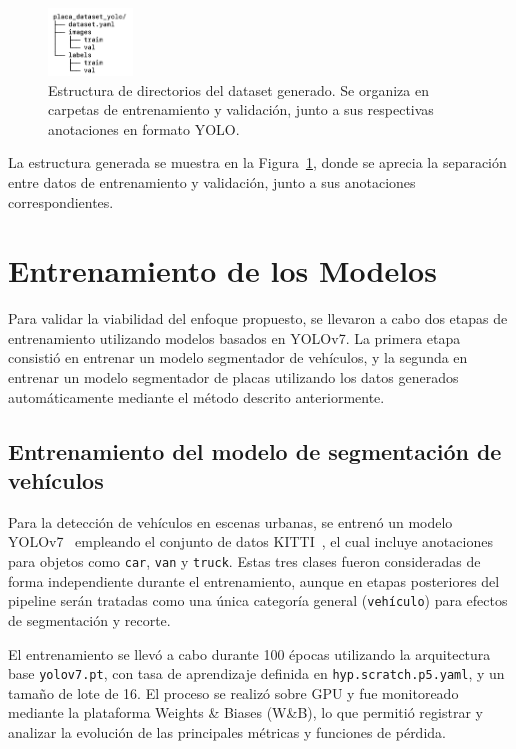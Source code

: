 \documentclass[conference]{IEEEtran}
\begin{document}
\begin{figure}[ht]
    \centering
    \includegraphics[width=0.20\textwidth]{figs/estructura_dataset.png}
    \caption{Estructura de directorios del dataset generado. Se organiza en carpetas de entrenamiento y validación, junto a sus respectivas anotaciones en formato YOLO.}
    \label{fig:dataset_structure}
\end{figure}

La estructura generada se muestra en la Figura~\ref{fig:dataset_structure}, donde se aprecia la separación entre datos de entrenamiento y validación, junto a sus anotaciones correspondientes.

\section{Entrenamiento de los Modelos}

Para validar la viabilidad del enfoque propuesto, se llevaron a cabo dos etapas de entrenamiento utilizando modelos basados en YOLOv7. La primera etapa consistió en entrenar un modelo segmentador de vehículos, y la segunda en entrenar un modelo segmentador de placas utilizando los datos generados automáticamente mediante el método descrito anteriormente.
\subsection{Entrenamiento del modelo de segmentación de vehículos}

Para la detección de vehículos en escenas urbanas, se entrenó un modelo YOLOv7~\cite{wang2022yolov7} empleando el conjunto de datos KITTI~\cite{geiger2012we}, el cual incluye anotaciones para objetos como \texttt{car}, \texttt{van} y \texttt{truck}. Estas tres clases fueron consideradas de forma independiente durante el entrenamiento, aunque en etapas posteriores del pipeline serán tratadas como una única categoría general (\texttt{vehículo}) para efectos de segmentación y recorte.

El entrenamiento se llevó a cabo durante 100 épocas utilizando la arquitectura base \texttt{yolov7.pt}, con tasa de aprendizaje definida en \texttt{hyp.scratch.p5.yaml}, y un tamaño de lote de 16. El proceso se realizó sobre GPU y fue monitoreado mediante la plataforma Weights \& Biases (W\&B), lo que permitió registrar y analizar la evolución de las principales métricas y funciones de pérdida.
\end{document}
